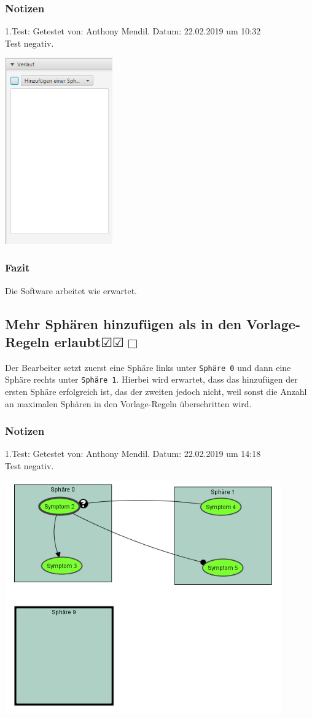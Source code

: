 \documentclass{scrartcl}
\newcommand{\subsectiont}[2]{\subsection[#1]{#1{\normalsize\normalfont #2}}}
\newcommand{\leer}{$\Box$}
\newcommand{\ok}{$\CheckedBox$}
\begin{document}
\subsubsection{Notizen}
1.Test: Getestet von: Anthony Mendil. Datum: 22.02.2019 um 10:32 \\
Test negativ.
\begin{center}
\includegraphics[height=8cm]{2_3.PNG}
\end{center}
\subsubsection{Fazit}
Die Software arbeitet wie erwartet.

\subsectiont{Mehr Sphären hinzufügen als in den Vorlage-Regeln erlaubt}{\dotfill\ok\ok\leer}
Der Bearbeiter setzt zuerst eine Sphäre links unter \texttt{Sphäre 0} und dann eine Sphäre rechts unter \texttt{Sphäre 1}. Hierbei wird erwartet, dass das hinzufügen der ersten Sphäre erfolgreich ist, das der zweiten jedoch nicht, weil sonst die Anzahl an maximalen Sphären in den Vorlage-Regeln überschritten wird. 
\subsubsection{Notizen}
1.Test: Getestet von: Anthony Mendil. Datum: 22.02.2019 um 14:18 \\
Test negativ.
\begin{center}
\includegraphics[height=10cm]{2_4.PNG}
\end{center}
\end{document}
